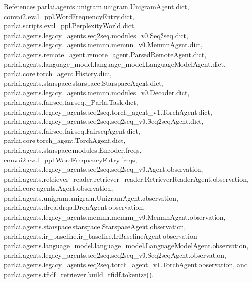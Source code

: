 References parlai.\+agents.\+unigram.\+unigram.\+Unigram\+Agent.\+dict, convai2.\+eval\+\_\+ppl.\+Word\+Frequency\+Entry.\+dict, parlai.\+scripts.\+eval\+\_\+ppl.\+Perplexity\+World.\+dict, parlai.\+agents.\+legacy\+\_\+agents.\+seq2seq.\+modules\+\_\+v0.\+Seq2seq.\+dict, parlai.\+agents.\+legacy\+\_\+agents.\+memnn.\+memnn\+\_\+v0.\+Memnn\+Agent.\+dict, parlai.\+agents.\+remote\+\_\+agent.\+remote\+\_\+agent.\+Parsed\+Remote\+Agent.\+dict, parlai.\+agents.\+language\+\_\+model.\+language\+\_\+model.\+Language\+Model\+Agent.\+dict, parlai.\+core.\+torch\+\_\+agent.\+History.\+dict, parlai.\+agents.\+starspace.\+starspace.\+Starspace\+Agent.\+dict, parlai.\+agents.\+legacy\+\_\+agents.\+memnn.\+modules\+\_\+v0.\+Decoder.\+dict, parlai.\+agents.\+fairseq.\+fairseq.\+\_\+\+Parlai\+Task.\+dict, parlai.\+agents.\+legacy\+\_\+agents.\+seq2seq.\+torch\+\_\+agent\+\_\+v1.\+Torch\+Agent.\+dict, parlai.\+agents.\+legacy\+\_\+agents.\+seq2seq.\+seq2seq\+\_\+v0.\+Seq2seq\+Agent.\+dict, parlai.\+agents.\+fairseq.\+fairseq.\+Fairseq\+Agent.\+dict, parlai.\+core.\+torch\+\_\+agent.\+Torch\+Agent.\+dict, parlai.\+agents.\+starspace.\+modules.\+Encoder.\+freqs, convai2.\+eval\+\_\+ppl.\+Word\+Frequency\+Entry.\+freqs, parlai.\+agents.\+legacy\+\_\+agents.\+seq2seq.\+seq2seq\+\_\+v0.\+Agent.\+observation, parlai.\+agents.\+retriever\+\_\+reader.\+retriever\+\_\+reader.\+Retriever\+Reader\+Agent.\+observation, parlai.\+core.\+agents.\+Agent.\+observation, parlai.\+agents.\+unigram.\+unigram.\+Unigram\+Agent.\+observation, parlai.\+agents.\+drqa.\+drqa.\+Drqa\+Agent.\+observation, parlai.\+agents.\+legacy\+\_\+agents.\+memnn.\+memnn\+\_\+v0.\+Memnn\+Agent.\+observation, parlai.\+agents.\+starspace.\+starspace.\+Starspace\+Agent.\+observation, parlai.\+agents.\+ir\+\_\+baseline.\+ir\+\_\+baseline.\+Ir\+Baseline\+Agent.\+observation, parlai.\+agents.\+language\+\_\+model.\+language\+\_\+model.\+Language\+Model\+Agent.\+observation, parlai.\+agents.\+legacy\+\_\+agents.\+seq2seq.\+seq2seq\+\_\+v0.\+Seq2seq\+Agent.\+observation, parlai.\+agents.\+legacy\+\_\+agents.\+seq2seq.\+torch\+\_\+agent\+\_\+v1.\+Torch\+Agent.\+observation, and parlai.\+agents.\+tfidf\+\_\+retriever.\+build\+\_\+tfidf.\+tokenize().

